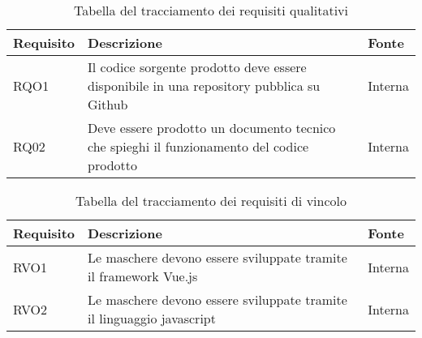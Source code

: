\begin{table}[H]
\caption{Tabella del tracciamento dei requisiti qualitativi}
\label{tab:requisiti-qualitativi}
\renewcommand{\arraystretch}{1.6}
\begin{tabularx}{\textwidth}{lXl}
\hline\hline
\textbf{Requisito} & \textbf{Descrizione} & \textbf{Fonte}\\
\hline
RQO1 & Il codice sorgente prodotto deve essere disponibile in una repository pubblica su Github & Interna \\
\hline
RQ02 & Deve essere prodotto un documento tecnico che spieghi il funzionamento del codice prodotto & Interna \\
\hline
\end{tabularx}
\end{table}%

\begin{table}[H]
\caption{Tabella del tracciamento dei requisiti di vincolo}
\label{tab:requisiti-vincolo}
\renewcommand{\arraystretch}{1.6}
\begin{tabularx}{\textwidth}{lXl}
\hline\hline
\textbf{Requisito} & \textbf{Descrizione} & \textbf{Fonte}\\
\hline
RVO1 & Le maschere devono essere sviluppate tramite il framework Vue.js & Interna \\
\hline
RVO2 & Le maschere devono essere sviluppate tramite il linguaggio javascript & Interna \\
\hline
\end{tabularx}
\end{table}%